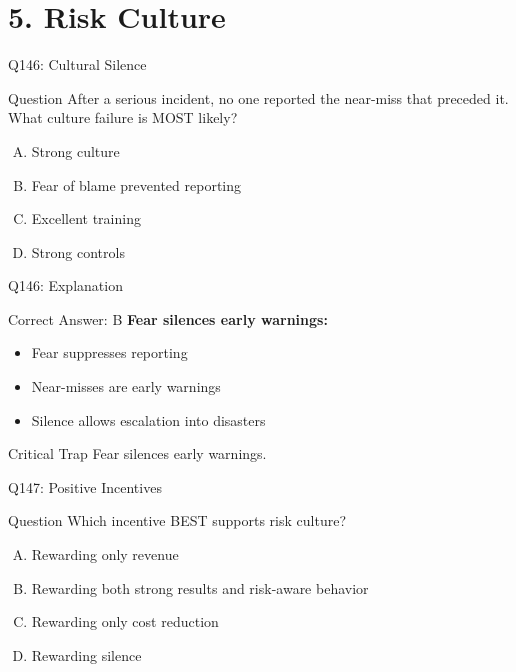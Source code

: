 \documentclass{beamer}
\begin{document}
	\section{5. Risk Culture}
	
	\begin{frame}{Q146: Cultural Silence}
		\begin{block}{Question}
			After a serious incident, no one reported the near-miss that preceded it. What culture failure is MOST likely?
		\end{block}
		\begin{enumerate}[(A)]
			\item Strong culture
			\item Fear of blame prevented reporting
			\item Excellent training
			\item Strong controls
		\end{enumerate}
	\end{frame}
	
	\begin{frame}{Q146: Explanation}
		\begin{block}{Correct Answer: B}
			\textbf{Fear silences early warnings:}
			\begin{itemize}
				\item Fear suppresses reporting
				\item Near-misses are early warnings
				\item Silence allows escalation into disasters
			\end{itemize}
		\end{block}
		\begin{alertblock}{Critical Trap}
			Fear silences early warnings.
		\end{alertblock}
	\end{frame}
	
	\begin{frame}{Q147: Positive Incentives}
		\begin{block}{Question}
			Which incentive BEST supports risk culture?
		\end{block}
		\begin{enumerate}[(A)]
			\item Rewarding only revenue
			\item Rewarding both strong results and risk-aware behavior
			\item Rewarding only cost reduction
			\item Rewarding silence
		\end{enumerate}
	\end{frame}
	
\end{document}
